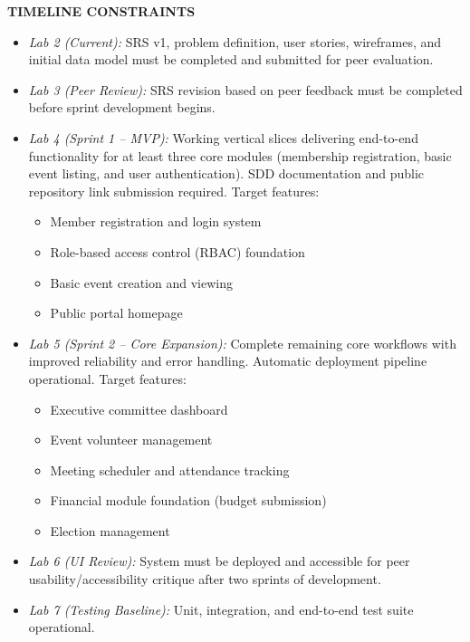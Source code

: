 \documentclass[12pt,a4paper]{article}
\begin{document}
\textbf{\small\color{Teal}TIMELINE CONSTRAINTS}\vspace{4pt} 

\begin{itemize}[noitemsep]
  \item \textit{Lab 2 (Current):} SRS v1, problem definition, user stories, wireframes, and initial data model must be completed and submitted for peer evaluation.
  
  \item \textit{Lab 3 (Peer Review):} SRS revision based on peer feedback must be completed before sprint development begins.
  
  \item \textit{Lab 4 (Sprint 1 -- MVP):} Working vertical slices delivering end-to-end functionality for at least three core modules (membership registration, basic event listing, and user authentication). SDD documentation and public repository link submission required. Target features:
  \begin{itemize}[noitemsep]
    \item Member registration and login system
    \item Role-based access control (RBAC) foundation
    \item Basic event creation and viewing
    \item Public portal homepage
  \end{itemize}
  
  \item \textit{Lab 5 (Sprint 2 -- Core Expansion):} Complete remaining core workflows with improved reliability and error handling. Automatic deployment pipeline operational. Target features:
  \begin{itemize}[noitemsep]
    \item Executive committee dashboard
    \item Event volunteer management
    \item Meeting scheduler and attendance tracking
    \item Financial module foundation (budget submission)
    \item Election management
  \end{itemize}
  
  \item \textit{Lab 6 (UI Review):} System must be deployed and accessible for peer usability/accessibility critique after two sprints of development.
  
  \item \textit{Lab 7 (Testing Baseline):} Unit, integration, and end-to-end test suite operational.
  

\end{itemize}
\end{document}
